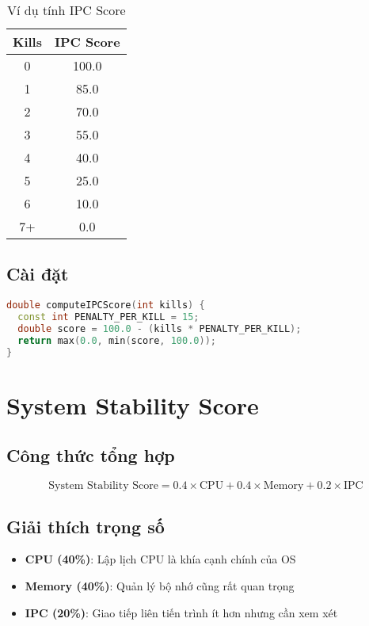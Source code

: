 \begin{table}[H]
\centering
\caption{Ví dụ tính IPC Score}
\begin{tabular}{cc}
\toprule
\textbf{Kills} & \textbf{IPC Score} \\
\midrule
0 & 100.0 \\
1 & 85.0 \\
2 & 70.0 \\
3 & 55.0 \\
4 & 40.0 \\
5 & 25.0 \\
6 & 10.0 \\
7+ & 0.0 \\
\bottomrule
\end{tabular}
\end{table}

\subsection{Cài đặt}

\begin{lstlisting}[language=C++,caption={IPC Score Computation}]
double computeIPCScore(int kills) {
  const int PENALTY_PER_KILL = 15;
  double score = 100.0 - (kills * PENALTY_PER_KILL);
  return max(0.0, min(score, 100.0));
}
\end{lstlisting}

\section{System Stability Score}

\subsection{Công thức tổng hợp}

\begin{equation}
\text{System Stability Score} = 0.4 \times \text{CPU} + 0.4 \times \text{Memory} + 0.2 \times \text{IPC}
\end{equation}

\subsection{Giải thích trọng số}

\begin{itemize}[leftmargin=1.5cm]
  \item \textbf{CPU (40\%)}: Lập lịch CPU là khía cạnh chính của OS
  \item \textbf{Memory (40\%)}: Quản lý bộ nhớ cũng rất quan trọng
  \item \textbf{IPC (20\%)}: Giao tiếp liên tiến trình ít hơn nhưng cần xem xét
\end{itemize}

